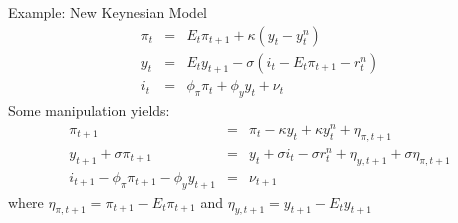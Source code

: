 \documentclass[11pt,aspectratio=169,xcolor={dvipsnames},hyperref={pdftex,pdfpagemode=UseNone,hidelinks,pdfdisplaydoctitle=true},usepdftitle=false]{beamer}
\begin{document}
\begin{frame}{Example: New Keynesian Model}
\begin{eqnarray*}
\pi_{t} & = & E_{t} \pi_{t+1} + \kappa (y_{t} - y_{t}^{n}) \\
y_{t}   & = & E_{t} y_{t+1} - \sigma (i_{t} - E_{t} \pi_{t+1} - r_{t}^{n} ) \\ 
i_{t}   & = & \phi_{\pi} \pi_{t} + \phi_{y} y_{t} + \nu_{t} 
\end{eqnarray*} \pause 
Some manipulation yields:
\begin{eqnarray*}
\pi_{t+1} & = & \pi_{t} - \kappa y_{t} + \kappa y_{t}^{n} + \eta_{\pi,t+1} \\
y_{t+1} + \sigma \pi_{t+1}  & = & y_{t} + \sigma i_{t} - \sigma r_{t}^{n} + \eta_{y,t+1} + \sigma \eta_{\pi,t+1} \\ 
i_{t+1} - \phi_{\pi} \pi_{t+1} - \phi_{y} y_{t+1} & = & \nu_{t+1} 
\end{eqnarray*}
where $\eta_{\pi,t+1} = \pi_{t+1} - E_{t} \pi_{t+1}$ and $\eta_{y,t+1} = y_{t+1} - E_{t} y_{t+1}$ 
\end{frame}
\end{document}
